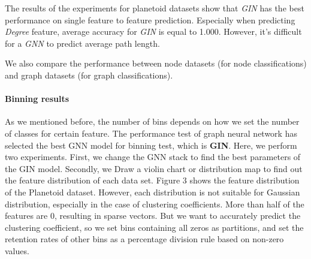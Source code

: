\documentclass[sigconf]{acmart}
\begin{document}
The results of the experiments for planetoid datasets show that \emph{GIN} has the best performance on single feature to feature prediction. 
Especially when predicting \emph{Degree} feature, average accuracy for \emph{GIN} is equal to 1.000.  
However, it's difficult for a \emph{GNN} to predict average path length. 



We also compare the performance between node datasets (for node classifications) and graph datasets (for graph classifications).


\paragraph{Binning results}
  As we mentioned before, the number of bins depends on how we set the number of classes for certain feature.
The performance test of graph neural network has selected the best GNN model for binning test, which is \textbf{GIN}.
Here, we perform two experiments. First, we change the GNN stack to find the best parameters of the GIN model. Secondly, we
Draw a violin chart or distribution map to find out the feature distribution of each data set. Figure 3 shows the feature distribution of the Planetoid dataset.
However, each distribution is not suitable for Gaussian distribution, especially in the case of clustering coefficients. More than half of the features are 0, resulting in sparse vectors.
But we want to accurately predict the clustering coefficient, so we set bins containing all zeros as partitions, and set the retention rates of other bins as a percentage division rule based on non-zero values.
\end{document}
